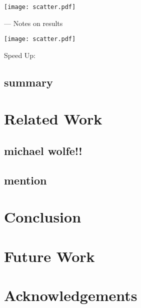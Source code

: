 \documentclass[11pt, twocolumn]{article}
\begin{document}
    \begin{center}
    \texttt{[image: scatter.pdf]}
    \end{center}

    --- Notes on results

    \begin{center}
    \texttt{[image: scatter.pdf]}
    \end{center}

    Speed Up:


    \subsection{summary} %

\section{Related Work} %
    \subsection{michael wolfe!!}
    \subsection{mention} %

\section{Conclusion} %

\section{Future Work} %
\section{Acknowledgements} %
\end{document}

